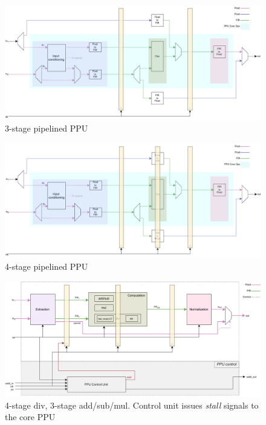 \begin{figure}
\centering
    \includegraphics[width=1\textwidth]{figures/top_all_PL2.pdf}
    \caption{3-stage pipelined PPU}
    \label{fig:top_all_PL2}
\end{figure}
\begin{figure}
\centering
    \includegraphics[width=1\textwidth]{figures/top_all_PL3.pdf}
    \caption{4-stage pipelined PPU}
    \label{fig:top_all_PL3}
\end{figure}


\begin{figure}[h!]
    \centering
    \includegraphics[width=1\textwidth]{figures/ppu_all_with_control_unit_3a.pdf}
    \caption{4-stage div, 3-stage add/sub/mul. Control unit issues \textit{stall} signals to the core PPU}
    \label{fig:ppu_with_control_unit1}
\end{figure}%
 

